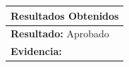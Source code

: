 \begin{minipage}{0.95\textwidth}
\begin{center}
\begin{tabularx}{\textwidth}{ | p{2cm} | X | X | X |}
        \hline
        \multicolumn{4}{|c|}{\textbf{Resultados Obtenidos}} \\
        \hline
        \multicolumn{4}{|l|}{\textbf{Resultado:} Aprobado} \\
        \hline
        \multicolumn{4}{|l|}{\textbf{Evidencia: }} \\
        \hline
     \end{tabularx}
    \label{CP007}
    \end{center}
    \end{minipage}
    
    